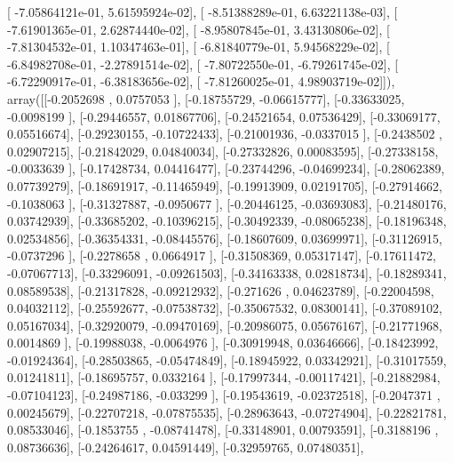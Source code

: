 \documentclass{article}
\begin{document}
       [ -7.05864121e-01,   5.61595924e-02],
       [ -8.51388289e-01,   6.63221138e-03],
       [ -7.61901365e-01,   2.62874440e-02],
       [ -8.95807845e-01,   3.43130806e-02],
       [ -7.81304532e-01,   1.10347463e-01],
       [ -6.81840779e-01,   5.94568229e-02],
       [ -6.84982708e-01,  -2.27891514e-02],
       [ -7.80722550e-01,  -6.79261745e-02],
       [ -6.72290917e-01,  -6.38183656e-02],
       [ -7.81260025e-01,   4.98903719e-02]]), array([[-0.2052698 ,  0.0757053 ],
       [-0.18755729, -0.06615777],
       [-0.33633025, -0.0098199 ],
       [-0.29446557,  0.01867706],
       [-0.24521654,  0.07536429],
       [-0.33069177,  0.05516674],
       [-0.29230155, -0.10722433],
       [-0.21001936, -0.0337015 ],
       [-0.2438502 ,  0.02907215],
       [-0.21842029,  0.04840034],
       [-0.27332826,  0.00083595],
       [-0.27338158, -0.0033639 ],
       [-0.17428734,  0.04416477],
       [-0.23744296, -0.04699234],
       [-0.28062389,  0.07739279],
       [-0.18691917, -0.11465949],
       [-0.19913909,  0.02191705],
       [-0.27914662, -0.1038063 ],
       [-0.31327887, -0.0950677 ],
       [-0.20446125, -0.03693083],
       [-0.21480176,  0.03742939],
       [-0.33685202, -0.10396215],
       [-0.30492339, -0.08065238],
       [-0.18196348,  0.02534856],
       [-0.36354331, -0.08445576],
       [-0.18607609,  0.03699971],
       [-0.31126915, -0.0737296 ],
       [-0.2278658 ,  0.0664917 ],
       [-0.31508369,  0.05317147],
       [-0.17611472, -0.07067713],
       [-0.33296091, -0.09261503],
       [-0.34163338,  0.02818734],
       [-0.18289341,  0.08589538],
       [-0.21317828, -0.09212932],
       [-0.271626  ,  0.04623789],
       [-0.22004598,  0.04032112],
       [-0.25592677, -0.07538732],
       [-0.35067532,  0.08300141],
       [-0.37089102,  0.05167034],
       [-0.32920079, -0.09470169],
       [-0.20986075,  0.05676167],
       [-0.21771968,  0.0014869 ],
       [-0.19988038, -0.0064976 ],
       [-0.30919948,  0.03646666],
       [-0.18423992, -0.01924364],
       [-0.28503865, -0.05474849],
       [-0.18945922,  0.03342921],
       [-0.31017559,  0.01241811],
       [-0.18695757,  0.0332164 ],
       [-0.17997344, -0.00117421],
       [-0.21882984, -0.07104123],
       [-0.24987186, -0.033299  ],
       [-0.19543619, -0.02372518],
       [-0.2047371 ,  0.00245679],
       [-0.22707218, -0.07875535],
       [-0.28963643, -0.07274904],
       [-0.22821781,  0.08533046],
       [-0.1853755 , -0.08741478],
       [-0.33148901,  0.00793591],
       [-0.3188196 ,  0.08736636],
       [-0.24264617,  0.04591449],
       [-0.32959765,  0.07480351],
\end{document}
